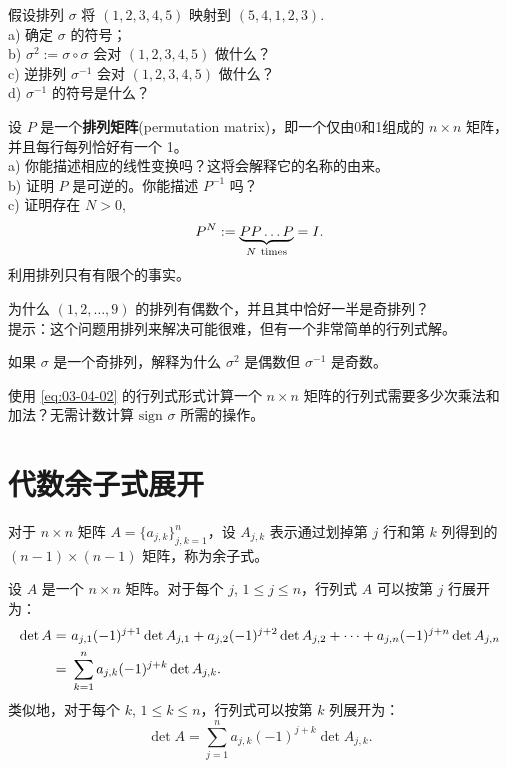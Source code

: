 \begin{problemset}
\item \label{ex:03-04-01} 假设排列 $\sigma$ 将 $(1, 2, 3, 4, 5)$ 映射到 $(5, 4, 1, 2, 3)$.~
\\
a) 确定 $\sigma$ 的符号；
\\
b) $\sigma^2 := \sigma \circ \sigma$ 会对 $(1, 2, 3, 4, 5)$ 做什么？
\\
c) 逆排列 $\sigma^{-1}$ 会对 $(1, 2, 3, 4, 5)$ 做什么？
\\
d) $\sigma^{-1}$ 的符号是什么？
\item \label{ex:03-04-02} 设 $P$ 是一个\textbf{排列矩阵}(permutation matrix)，即一个仅由0和1组成的 $n \times n$ 矩阵，并且每行每列恰好有一个 1。
\\
a) 你能描述相应的线性变换吗？这将会解释它的名称的由来。
\\
b) 证明 $P$ 是可逆的。你能描述 $P^{-1}$ 吗？
\\
c) 证明存在 $N > 0$,
$$P^N := \underset{N ~\rm times}{\underbrace{P P \dots P}}= I.$$
利用排列只有有限个的事实。
\item \label{ex:03-04-03} 为什么 $(1, 2, \dots, 9)$ 的排列有偶数个，并且其中恰好一半是奇排列？
\\
{\heiti 提示}：这个问题用排列来解决可能很难，但有一个非常简单的行列式解。
\item \label{ex:03-04-04} 如果 $\sigma$ 是一个奇排列，解释为什么 $\sigma^2$ 是偶数但 $\sigma^{-1}$ 是奇数。
\item \label{ex:03-04-05} 使用 \eqref{eq:03-04-02} 的行列式形式计算一个 $n \times n$ 矩阵的行列式需要多少次乘法和加法？无需计数计算 $\text{sign } \sigma$ 所需的操作。
\end{problemset}


\section{代数余子式展开}\label{sec:03-05}

对于 $n \times n$ 矩阵 $A = \{a_{j,k}\}^{n}_{j,k=1}$，设 $A_{j,k}$ 表示通过划掉第 $j$ 行和第 $k$ 列得到的 $(n-1) \times (n-1)$ 矩阵，称为余子式。

\begin{theorem}[行列式的代数余子式展开]\label{stmt:03-05-01}
 设 $A$ 是一个 $n \times n$ 矩阵。对于每个 $j$, $1 \le j \le n$，行列式 $A$ 可以按第 $j$ 行展开为：
\begin{equation} \notag\begin{split}
\det A =&\ a_{j,1} (-1)^{j+1} \det A_{j,1} + a_{j,2} (-1)^{j+2} \det A_{j,2} + \dots + a_{j,n} (-1)^{j+n} \det A_{j,n} \\
=&\ \sum_{k=1}^n a_{j,k} (-1)^{j+k} \det A_{j,k}.\end{split}\end{equation}
类似地，对于每个 $k$, $1 \le k \le n$，行列式可以按第 $k$ 列展开为：
$$
\det A = \sum_{j=1}^n a_{j,k} (-1)^{j+k} \det A_{j,k}.
$$\end{theorem}


